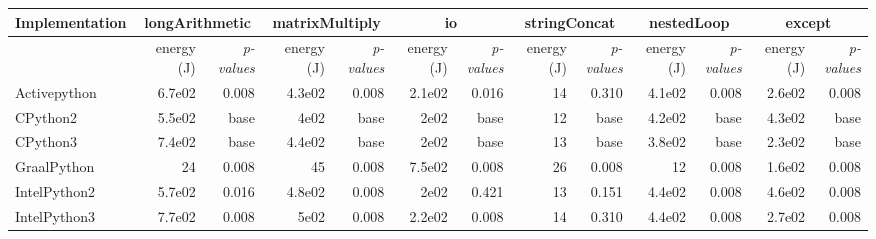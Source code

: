 \begin{table*}[htbp]
{\begin{tabular}{l|rr|rr|rr|rr|rr|rr}
            Implementation & \multicolumn{2}{c}{longArithmetic} & \multicolumn{2}{c}{matrixMultiply} & \multicolumn{2}{c}{io} & \multicolumn{2}{c}{stringConcat} & \multicolumn{2}{c}{nestedLoop} & \multicolumn{2}{c}{except}                                                                                     \\
            \midrule
                           & energy (J)                         & \em p-values                       & energy (J)             & \em p-values                     & energy (J)                     & \em p-values               & energy (J) & \em p-values & energy (J) & \em p-values & energy (J) & \em p-values \\
            Activepython   & 6.7e02                             & 0.008                              & 4.3e02                 & 0.008                            & 2.1e02                         & 0.016                      & 14         & 0.310        & 4.1e02     & 0.008        & 2.6e02     & 0.008        \\
            CPython2       & 5.5e02                             & base                             & 4e02                   & base                           & 2e02                           & base                     & 12         & base       & 4.2e02     & base       & 4.3e02     & base       \\
            CPython3       & 7.4e02                             & base                             & 4.4e02                 & base                           & 2e02                           & base                     & 13         & base       & 3.8e02     & base       & 2.3e02     & base       \\
            GraalPython    & 24                                 & 0.008                              & 45                     & 0.008                            & 7.5e02                         & 0.008                      & 26         & 0.008        & 12         & 0.008        & 1.6e02     & 0.008        \\
            IntelPython2   & 5.7e02                             & 0.016                              & 4.8e02                 & 0.008                            & 2e02                           & 0.421                      & 13         & 0.151        & 4.4e02     & 0.008        & 4.6e02     & 0.008        \\
            IntelPython3   & 7.7e02                             & 0.008                              & 5e02                   & 0.008                            & 2.2e02                         & 0.008                      & 14         & 0.310        & 4.4e02     & 0.008        & 2.7e02     & 0.008        \\

\end{tabular}}
\end{table*}
